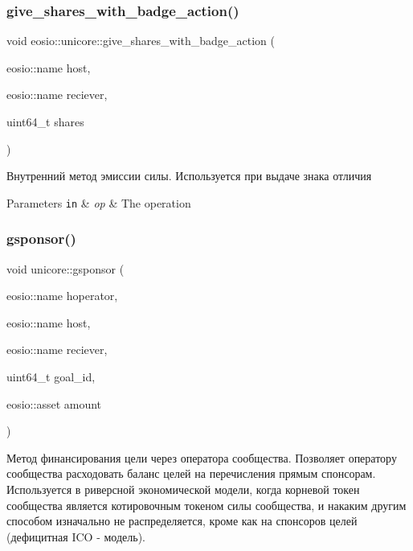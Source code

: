 \subsubsection{\texorpdfstring{give\+\_\+shares\+\_\+with\+\_\+badge\+\_\+action()}{give\_shares\_with\_badge\_action()}}
{\footnotesize\ttfamily void eosio\+::unicore\+::give\+\_\+shares\+\_\+with\+\_\+badge\+\_\+action (\begin{DoxyParamCaption}\item[{eosio\+::name}]{host,  }\item[{eosio\+::name}]{reciever,  }\item[{uint64\+\_\+t}]{shares }\end{DoxyParamCaption})\hspace{0.3cm}{\ttfamily [static]}}



Внутренний метод эмиссии силы. Используется при выдаче знака отличия 


\begin{DoxyParams}[1]{Parameters}
\mbox{\tt in}  & {\em op} & The operation \\
\hline
\end{DoxyParams}
\mbox{\label{classeosio_1_1unicore_a621817942c7b2758963d4147170b3c60}} 
\subsubsection{\texorpdfstring{gsponsor()}{gsponsor()}}
{\footnotesize\ttfamily void unicore\+::gsponsor (\begin{DoxyParamCaption}\item[{eosio\+::name}]{hoperator,  }\item[{eosio\+::name}]{host,  }\item[{eosio\+::name}]{reciever,  }\item[{uint64\+\_\+t}]{goal\+\_\+id,  }\item[{eosio\+::asset}]{amount }\end{DoxyParamCaption})}



Метод финансирования цели через оператора сообщества. Позволяет оператору сообщества расходовать баланс целей на перечисления прямым спонсорам. Используется в риверсной экономической модели, когда корневой токен сообщества является котировочным токеном силы сообщества, и накаким другим способом изначально не распределяется, кроме как на спонсоров целей (дефицитная I\+CO -\/ модель). 


